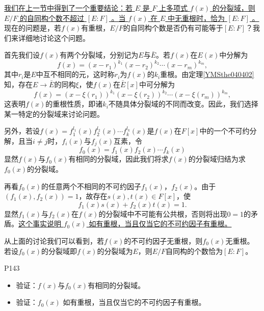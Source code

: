 \original
{
	\uline{我们在上一节中得到了一个重要结论：若 $E$ 是 $F$ 上多项式 $f(x)$ 的分裂域，则 $E/F$ 的自同构个数不超过 $[E:F]$ 。当 $f(x)$ 在 $E$ 中无重根时，恰为 $[E:F]$ 。}现在的问题是，若$f(x)$有重根，$E/F$的自同构个数是否仍有可能等于$[E:F]$？我们来详细地讨论这个问题。
	\par
	首先我们设$f(x)$有两个分裂域，分别记为$E$与$\bar{E}$。若$f(x)$在$E(x)$中分解为
	\begin{equation*}
		f(x)=(x-r_{1})^{k_{1}}(x-r_{2})^{k_{2}}\cdots(x-r_{m})^{k_{m}},
	\end{equation*}
	其中$r_{i}$是$E$中互不相同的元，这时称$r_{i}$为$f(x)$的$k_{i}$重根。由定理\ref{YMSthe040402}知，存在$E \rightarrow \bar{E}$的同构$\xi$，使$f(x)$在$\bar{E}[x]$中可分解为
	\begin{equation*}
		f(x)=(x-\xi(r_{1}))^{k_{1}}(x-\xi(r_{2}))^{k_{2}}\cdots(x-\xi(r_{m}))^{k_{m}},
	\end{equation*}
	这表明$f(x)$的重根性质，即诸$k_{i}$不随具体分裂域的不同而改变。因此，我们选择某一特定的分裂域来讨论问题。
	\par
	另外，若设$f(x)=f_{1}^{l_{1}}(x)f_{2}^{l_{2}}(x)\cdots f_{k}^{l_{k}}(x)$是$f(x)$在$F[x]$中的一个不可约分解，且当$i\neq j$时，$f_{i}(x)$与$f_{j}(x)$互素，令
	\begin{equation*}
		f_{0}(x)=f_{1}(x)f_{2}(x)\cdots f_{k}(x)
	\end{equation*}
	显然$f(x)$与$f_{0}(x)$有相同的分裂域，因此我们将求$f(x)$的分裂域归结为求$f_{0}(x)$的分裂域。
	\par
	再看$f_{0}(x)$的任意两个不相同的不可约因子$f_{1}(x)$，$f_{2}(x)$。由于$(f_{1}(x),f_{2}(x))=1$，故存在$s(x),t(x)\in F[x]$，使
	\begin{equation*}
		f_{1}(x)s(x)+f_{2}(x)t(x)=1.
	\end{equation*}
	显然$f_{1}(x)$与$f_{2}(x)$在$f(x)$的分裂域中不可能有公共根，否则将出现$0=1$的矛盾。\uline{这个事实说明 $f_{0}(x)$ 如有重根，当且仅当它的不可约因子有重根。}
	\par
	从上面的讨论我们可以看到，若$f(x)$的不可约因子无重根，则$f_{0}(x)$无重根。若设$f_{0}(x)$的分裂域即$f(x)$的分裂域为$E$，则$E/F$自同构的个数恰为$[E:F]$。
}
{P143}




\begin{proposition}
	\begin{itemize}
		\item 验证：$f(x)$与$f_{0}(x)$有相同的分裂域。
		\item 验证：$f_{0}(x)$ 如有重根，当且仅当它的不可约因子有重根。
	\end{itemize}
\end{proposition}


